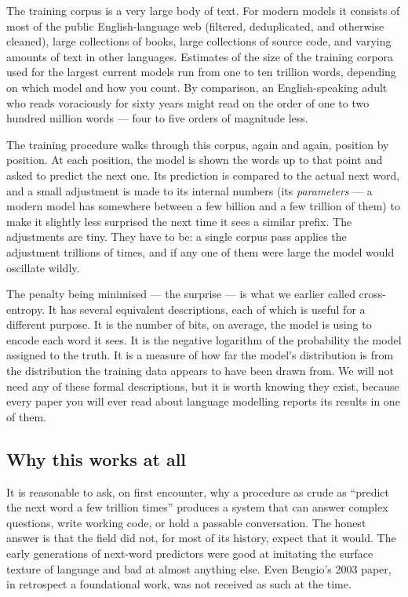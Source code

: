 The training corpus is a very large body of text. For modern
models it consists of most of the public English-language web
(filtered, deduplicated, and otherwise cleaned), large
collections of books, large collections of source code, and
varying amounts of text in other languages. Estimates of the
size of the training corpora used for the largest current
models run from one to ten trillion words, depending on which
model and how you count. By comparison, an English-speaking
adult who reads voraciously for sixty years might read on the
order of one to two hundred million words --- four to five
orders of magnitude less.

The training procedure walks through this corpus, again and
again, position by position. At each position, the model is
shown the words up to that point and asked to predict the next
one. Its prediction is compared to the actual next word, and a
small adjustment is made to its internal numbers (its
\emph{parameters} --- a modern model has somewhere between
a few billion and a few trillion of them) to make it slightly
less surprised the next time it sees a similar prefix. The
adjustments are tiny. They have to be: a single corpus pass
applies the adjustment trillions of times, and if any one of
them were large the model would oscillate wildly.

The penalty being minimised --- the surprise --- is what
we earlier called cross-entropy. It has several equivalent
descriptions, each of which is useful for a different purpose.
It is the number of bits, on average, the model is using to
encode each word it sees. It is the negative logarithm of the
probability the model assigned to the truth. It is a measure of
how far the model's distribution is from the distribution the
training data appears to have been drawn from. We will not
need any of these formal descriptions, but it is worth knowing
they exist, because every paper you will ever read about
language modelling reports its results in one of them.

\subsection*{Why this works at all}

It is reasonable to ask, on first encounter, why a procedure as
crude as ``predict the next word a few trillion times'' produces
a system that can answer complex questions, write working code,
or hold a passable conversation. The honest answer is that the
field did not, for most of its history, expect that it would.
The early generations of next-word predictors were good at
imitating the surface texture of language and bad at almost
anything else. Even Bengio's 2003 paper, in retrospect a
foundational work, was not received as such at the time.

